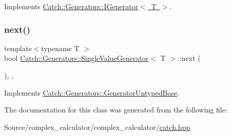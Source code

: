 Implements \mbox{\hyperlink{struct_catch_1_1_generators_1_1_i_generator_a525d381fc9249a885b075a0632a8579a}{Catch\+::\+Generators\+::\+I\+Generator$<$ T $>$}}.

\mbox{\label{class_catch_1_1_generators_1_1_single_value_generator_a10833b34e3ccbc484624185712eb8b6e}} 
\subsubsection{\texorpdfstring{next()}{next()}}
{\footnotesize\ttfamily template$<$typename T $>$ \\
bool \mbox{\hyperlink{class_catch_1_1_generators_1_1_single_value_generator}{Catch\+::\+Generators\+::\+Single\+Value\+Generator}}$<$ T $>$\+::next (\begin{DoxyParamCaption}{ }\end{DoxyParamCaption})\hspace{0.3cm}{\ttfamily [inline]}, {\ttfamily [override]}, {\ttfamily [virtual]}}



Implements \mbox{\hyperlink{class_catch_1_1_generators_1_1_generator_untyped_base_aeed3c0cd6233c5f553549e453b8d6638}{Catch\+::\+Generators\+::\+Generator\+Untyped\+Base}}.



The documentation for this class was generated from the following file\+:\begin{DoxyCompactItemize}
\item 
Source/complex\+\_\+calculator/complex\+\_\+calculator/\mbox{\hyperlink{catch_8hpp}{catch.\+hpp}}\end{DoxyCompactItemize}
